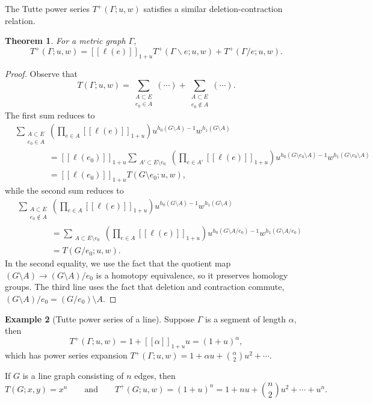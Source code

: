 \documentclass{amsart}
\newtheorem{thm}{Theorem}
\theoremstyle{definition}
\newtheorem{eg}[thm]{Example}
\newcommand{\fanalog}[2]{[\![#2]\!]_{#1}}
\begin{document}
The Tutte power series $T^+(\Gamma; u,w)$ satisfies a similar deletion-contraction relation.

\begin{thm}
For a metric graph $\Gamma$,
\begin{equation}
T^+(\Gamma; u,w) = \fanalog{1 + u}{\ell(e)} T^+(\Gamma \backslash e; u,w) + T^+(\Gamma / e; u,w) .
\end{equation}
\end{thm}

\begin{proof}
Observe that
\[
	T(\Gamma; u,w) = \sum_{\substack{A \subset E \\ e_0 \in A}} (\cdots) + \sum_{\substack{A \subset E \\ e_0 \not \in A}} (\cdots).
\]
The first sum reduces to
\begin{align*}
	&\sum_{\substack{A \subset E \\ e_0 \in A}} \left( \prod_{e \in A} \fanalog{1+u}{\ell(e)} \right) u^{h_0(G\setminus A)-1}w^{h_1(G\setminus A)}\\
	&\qquad\qquad = \fanalog{1+u}{\ell(e_0)} \sum_{\substack{A' \subset E \setminus e_0}} \left( \prod_{e \in A'}\fanalog{1+u}{\ell(e)} \right) u^{h_0(G\setminus e_0\setminus A)-1}w^{h_1(G\setminus e_0\setminus A)} \\[1.5em]
	&\qquad\qquad = \fanalog{1+u}{\ell(e_0)} T(G\setminus e_0;u,w),
\end{align*}
while the second sum reduces to
\begin{align*}
	&\sum_{\substack{A \subset E \\ e_0 \not\in A}} \left( \prod_{e \in A} \fanalog{1+u}{\ell(e)} \right) u^{h_0(G\setminus A)-1}w^{h_1(G\setminus A)}\\
	&\qquad\qquad = \sum_{\substack{A \subset E \setminus e_0}} \left( \prod_{e \in A} \fanalog{1+u}{\ell(e)} \right) u^{h_0(G \setminus A / e_0)-1}w^{h_1(G\setminus A / e_0)} \\[1.5em]
	&\qquad\qquad = T(G/ e_0;u,w).
\end{align*}
In the second equality, we use the fact that the quotient map $(G\setminus A) \to (G\setminus A)/e_0$ is a homotopy equivalence, so it preserves homology groups. The third line uses the fact that deletion and contraction commute, $(G \setminus A) / e_0 = (G / e_0) \setminus A$.
\end{proof}

\begin{eg}[Tutte power series of a line]
Suppose $\Gamma$ is a segment of length $\alpha$,
then
\[
	T^+(\Gamma;u,w) 
	= 1 + \fanalog{1 + u}{\alpha} u
	= (1+u)^\alpha,
\]
which has power series expansion
$
T^+(\Gamma;u,w) 
= 1 + \alpha u + \binom{\alpha}{2}u^2 + \cdots .
$

If $G$ is a line graph consisting of $n$ edges,
then
$$
T(G;x,y) = x^n 
\qquad\text{and}\qquad 
T^+(G;u,w) = (1+u)^n = 1 + nu + \binom{n}{2}u^2 + \cdots + u^n.
$$
\end{eg}
\end{document}
